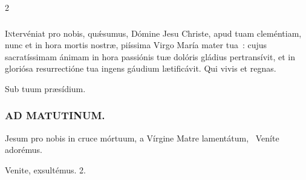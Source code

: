 \documentclass[9pt,twoside]{extarticle}
\begin{document}
\begin{multicols}{2}
\subsubsection*{\center {}}
\lettrine{I}ntervéniat pro nobis, quǽsumus, Dómine Jesu Christe, apud tuam cleméntiam, nunc et in hora mortis nostræ, piíssima Virgo María mater tua~: cujus sacratíssimam ánimam in hora passiónis tuæ dolóris gládius pertransívit, et in gloriósa resurrectióne tua ingens gáudium lætificávit. Qui vivis et regnas.

\begin{tightlist}{}
\item {} Sub tuum præsídium.
\end{tightlist}

\subsubsection*{\center \textsc{AD MATUTINUM.}}
\begin{tightlist}{}
\item {} Jesum pro nobis in cruce mórtuum, a Vírgine Matre lamentátum, \textred{*}~Veníte adorémus.
\item {} Venite, exsultémus. 2.
\end{tightlist}


\end{multicols}
\end{document}
